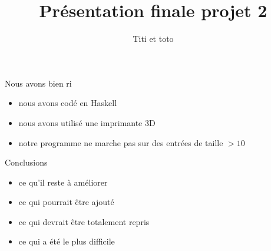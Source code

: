 \documentclass{beamer}
\title{Présentation finale projet 2}
\author{Titi et toto}
\institute{}
\date{}
\begin{document}
\maketitle

\begin{frame}{Nous avons bien ri}

  \begin{itemize}
  \item nous avons codé en Haskell

  \item nous avons utilisé une imprimante 3D

    \pause


  \item notre programme ne marche pas sur des entrées de taille $>10$

  \end{itemize}
  
\end{frame}

\begin{frame}{Conclusions}

  \begin{itemize}
  \item ce qu'il reste à améliorer

  \item ce qui pourrait être ajouté

  \item ce qui devrait être totalement repris

  \item ce qui a été le plus difficile
  \end{itemize}
  
\end{frame}
\end{document}
